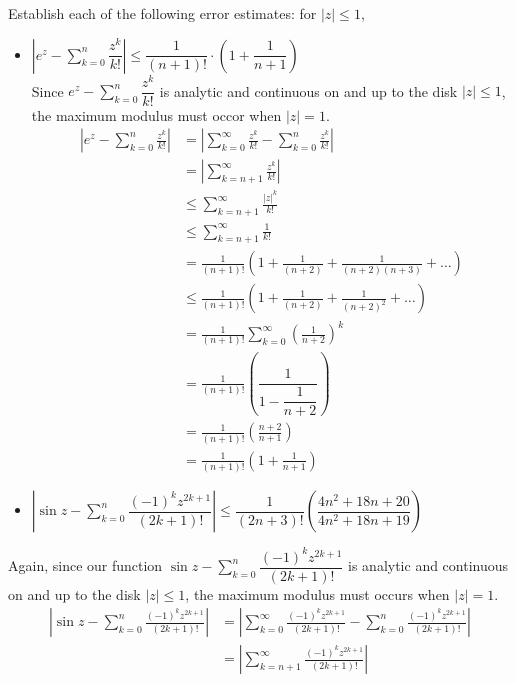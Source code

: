 \documentclass[12pt]{article}
\newenvironment{exercise}[2][Exercise]{\begin{trivlist}
\item[\hskip \labelsep {\bfseries #1} \hskip \labelsep {\bfseries #2.}]}{\end{trivlist}}
\begin{document}
\begin{exercise}{5.2.18}
	Establish each of the following error estimates: for $|z| \le 1$,
	\begin{itemize}
		\item[(a)] $\left|e^z - \sum\limits_{k=0}^n \dfrac{z^k}{k!}\right| \le \dfrac{1}{(n+1)!}\cdot\left(1 + \dfrac{1}{n+1}\right)$ \\
			Since $e^z - \sum\limits_{k=0}^n \dfrac{z^k}{k!}$ is analytic and continuous on and up to the disk $|z| \le 1$, the maximum modulus must occor when $|z| = 1$.
			\begin{align*}
				\left|e^z - \sum_{k=0}^n \frac{z^k}{k!}\right| &= \left|\sum_{k=0}^{\infty} \frac{z^k}{k!} - \sum_{k=0}^n \frac{z^k}{k!}\right| \\
										 &= \left|\sum_{k=n+1}^{\infty} \frac{z^k}{k!}\right| \\
										 &\le \sum_{k=n+1}^{\infty} \frac{|z|^k}{k!} \\
										 &\le \sum_{k=n+1}^{\infty} \frac{1}{k!} \\
										 &= \frac{1}{(n+1)!}\left(1 + \frac{1}{(n+2)} + \frac{1}{(n+2)(n+3)} + \ldots\right) \\
										 &\le \frac{1}{(n+1)!}\left(1 + \frac{1}{(n+2)} + \frac{1}{(n+2)^2} + \ldots\right) \\
										 &= \frac{1}{(n+1)!}\sum_{k=0}^{\infty} \left(\frac{1}{n+2}\right)^k \\
										 &= \frac{1}{(n+1)!}\left(\dfrac{1}{1 - \dfrac{1}{n+2}}\right) \\
										 &= \frac{1}{(n+1)!}\left(\frac{n+2}{n+1}\right) \\
										 &= \frac{1}{(n+1)!}\left(1 + \frac{1}{n+1}\right)
			\end{align*}
		\item[(b)] $\left|\sin z - \sum\limits_{k=0}^n \dfrac{(-1)^kz^{2k+1}}{(2k+1)!}\right| \le \dfrac{1}{(2n+3)!}\left(\dfrac{4n^2 + 18n + 20}{4n^2 + 18n + 19}\right)$
	\end{itemize}
	Again, since our function $\sin z - \sum\limits_{k=0}^n \dfrac{(-1)^kz^{2k+1}}{(2k+1)!}$ is analytic and continuous on and up to the disk $|z| \le 1$, the maximum modulus must occurs when $|z| = 1$.
	\begin{align*}
		\left|\sin z - \sum_{k=0}^n \frac{(-1)^kz^{2k+1}}{(2k+1)!}\right| &= \left|\sum_{k=0}^{\infty} \frac{(-1)^kz^{2k+1}}{(2k+1)!} - \sum_{k=0}^n \frac{(-1)^kz^{2k+1}}{(2k+1)!}\right| \\
										  &= \left|\sum_{k=n+1}^{\infty} \frac{(-1)^kz^{2k+1}}{(2k+1)!}\right| \\

\end{align*}
\end{exercise}
\end{document}
